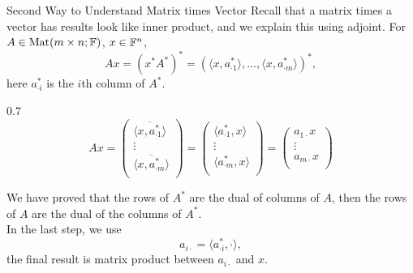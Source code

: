 \documentclass[hyperref={pdfpagelabels=true}]{beamer}
\newcommand{\Mat}{\text{Mat}}
\newcommand{\<}{\langle}
\renewcommand{\>}{\rangle}
\newenvironment{shrinkeq}[1]%
{ \bgroup
  \addtolength\abovedisplayshortskip{#1}
  \addtolength\abovedisplayskip{#1}
  \addtolength\belowdisplayshortskip{#1}
  \addtolength\belowdisplayskip{#1}}
{\egroup\ignorespacesafterend}
\begin{document}
    \begin{frame}{Second Way to Understand Matrix times Vector}
        Recall that a matrix times a vector has results look like inner product, and we explain this using adjoint. For $A \in \Mat(m \times n;\F)$, $x \in \mathbb{F}^{n}$,
        \[
            Ax = (x^{*}A^{*})^{*} = (\<x,a_{\cdot 1}^{*}\>,...,\<x,a_{\cdot m}^{*}\>)^{*},
        \]
        here $a_{\cdot i}^{*}$ is the $i$th column of $A^{*}$.\\
        \begin{spacing}{0.7}
        \[Ax = 
        \begin{pmatrix}
            \overline{\<x,a_{\cdot 1}^{*}\>}\\
            \vdots\\
            \overline{\<x,a_{\cdot m}^{*}\>}\\
        \end{pmatrix} = 
        \begin{pmatrix}
            \<a_{\cdot 1}^{*},x\>\\
            \vdots\\
            \<a_{\cdot m}^{*},x\>\\
        \end{pmatrix} =
        \begin{pmatrix}
            a_{1 \cdot}x\\
            \vdots\\
            a_{m \cdot}x\\
        \end{pmatrix}
        \]
    \end{spacing}
        We have proved that the rows of $A^{*}$ are the dual of columns of $A$, then the rows of $A$ are the dual of the columns of $A^{*}$.\\
        In the last step, we use
        \begin{shrinkeq}{-0.3em}
        \[a_{i \cdot} = \<a_{\cdot i}^{*}, \cdot\>,\]
        \end{shrinkeq}
        the final result is matrix product between $a_{i \cdot}$ and $x$.
\end{frame}
\end{document}
